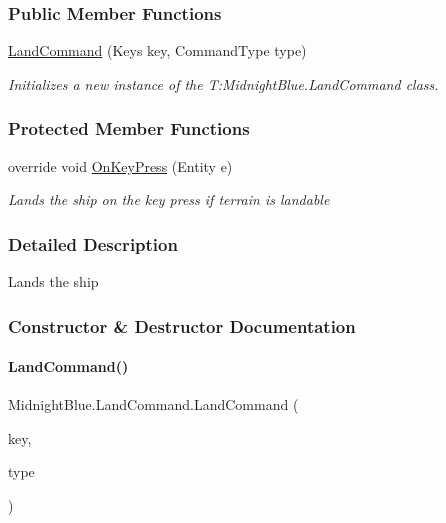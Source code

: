\subsubsection*{Public Member Functions}
\begin{DoxyCompactItemize}
\item 
\hyperlink{class_midnight_blue_1_1_land_command_a936907822e22547099ec5267628fd457}{Land\+Command} (Keys key, Command\+Type type)
\begin{DoxyCompactList}\small\item\em Initializes a new instance of the T\+:\+Midnight\+Blue.\+Land\+Command class. \end{DoxyCompactList}\end{DoxyCompactItemize}
\subsubsection*{Protected Member Functions}
\begin{DoxyCompactItemize}
\item 
override void \hyperlink{class_midnight_blue_1_1_land_command_a2c496d96aed4498bb3ca133fcea4b172}{On\+Key\+Press} (Entity e)
\begin{DoxyCompactList}\small\item\em Lands the ship on the key press if terrain is landable \end{DoxyCompactList}\end{DoxyCompactItemize}


\subsubsection{Detailed Description}
Lands the ship 



\subsubsection{Constructor \& Destructor Documentation}
\hypertarget{class_midnight_blue_1_1_land_command_a936907822e22547099ec5267628fd457}{}\label{class_midnight_blue_1_1_land_command_a936907822e22547099ec5267628fd457} 
\paragraph{\texorpdfstring{Land\+Command()}{LandCommand()}}
{\footnotesize\ttfamily Midnight\+Blue.\+Land\+Command.\+Land\+Command (\begin{DoxyParamCaption}\item[{Keys}]{key,  }\item[{Command\+Type}]{type }\end{DoxyParamCaption})\hspace{0.3cm}{\ttfamily [inline]}}



